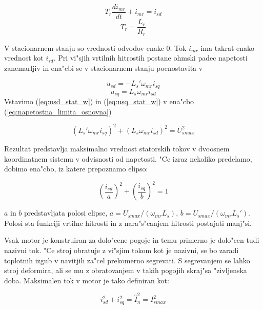 \documentclass[journal,a4paper,twoside]{sty/IEEEtran}
\begin{document}
\begin{equation}
T_r\frac{di_{mr}}{dt}+i_{mr} =i_{sd}
\label{eq:imr}
\end{equation}
\begin{equation}
T_r=\frac{L_r}{R_r}
\label{eq:Tr}
\end{equation}


V stacionarnem stanju so vrednosti odvodov enake 0. Tok $i_{mr}$ ima takrat enako vrednost kot $i_{sd}$. Pri vi"sjih vrtilnih hitrostih postane ohmski padec napetosti zanemarljiv in ena"cbi se v stacionarnem stanju poenostavita v

\begin{equation}
u_{sd}= - L_s' \omega_{mr} i_{sq}
\label{eq:usd_stat_w}
\end{equation}
\begin{equation}
u_{sq}=  L_s \omega_{mr}i_{sd}
\label{eq:usq_stat_w}
\end{equation}
 Vstavimo (\ref{eq:usd_stat_w}) in (\ref{eq:usq_stat_w}) v ena"cbo (\ref{eq:napetostna_limita_osnovna})

\begin{equation}
(L_s' \omega_{mr} i_{sq})^2+(L_s \omega_{mr}i_{sd})^2= U_{smax}^2
\label{eq:napetostnalim1}
\end{equation}

Rezultat predstavlja maksimalno vrednost statorskih tokov v dvoosnem koordinatnem sistemu v odvisnosti od napetosti. "Ce izraz nekoliko predelamo, dobimo ena"cbo, iz katere prepoznamo elipso: 

\begin{equation}
(\frac{i_{sd}}{a})^2+(\frac{i_{sq}}{b})^2 = 1
\label{eq:napetostnalim}
\end{equation}

$a$ in $b$ predstavljata polosi elipse, $a=U_{smax}/(\omega_{mr}L_s)$, $b=U_{smax}/(\omega_{mr}L_s')$. Polosi sta funkciji vrtilne hitrosti in z nara"s"canjem hitrosti postajati manj"si.

Vsak motor je konstruiran za dolo"cene pogoje in temu primerno je dolo"cen tudi nazivni tok. "Ce stroj obratuje z vi"sjim tokom kot je nazivni, se bo zaradi toplotnih izgub v navitjih za"cel prekomerno segrevati. S segrevanjem se lahko stroj deformira, ali se mu z obratovanjem v takih pogojih skraj"sa "zivljenska doba. Maksimalen tok v motor je tako definiran kot:

\begin{equation}
i_{sd}^2+i_{sq}^2=\hat{I}_{n}^2=I_{smax}^2
\label{eq:tokovnalim}
\end{equation}
\end{document}
